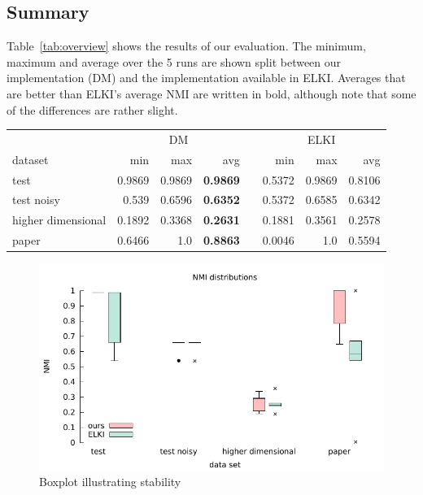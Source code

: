 \documentclass[english]{scrartcl}
\begin{document}
\subsection{Summary}

Table~\ref{tab:overview} shows the results of our evaluation. The minimum,
maximum and average over the 5 runs are shown split between our implementation
(DM) and the implementation available in ELKI. Averages that are better than
ELKI's average NMI are written in bold, although note that some of the differences
are rather slight.

\begin{table}[]\centering
  \begin{tabular}{lrrrcrrr}\toprule
     & \multicolumn{3}{c}{DM} & \phantom{abc} & \multicolumn{3}{c}{ELKI}\\
    dataset & min & max & avg & & min & max & avg\\ \midrule
    test & 0.9869 & 0.9869 & \textbf{0.9869} & & 0.5372 & 0.9869 & 0.8106\\
    test noisy & 0.539 & 0.6596 & \textbf{0.6352} & & 0.5372 & 0.6585 & 0.6342\\
    higher dimensional & 0.1892 & 0.3368 & \textbf{0.2631} & & 0.1881 & 0.3561 & 0.2578\\
    paper & 0.6466 & 1.0 & \textbf{0.8863} & & 0.0046 & 1.0 & 0.5594\\
  \bottomrule
  \end{tabular}
\end{table}


\begin{figure}[t!]
    \centering
    \includegraphics[width=\textwidth]{img/boxplt}
    \caption{Boxplot illustrating stability}
    \label{fig:box}
\end{figure}
\end{document}
